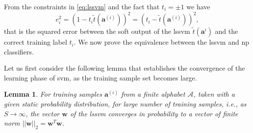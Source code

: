 \documentclass[draftcls,onecolumn,12pt]{IEEEtran}
\newtheorem{lemma}{Lemma}
\begin{document}
From the constraints in \eqref{eq:lssvm} and the fact that $t_i = \pm 1$ we have
\begin{equation}
\label{eq:els}
e_i^2 = (1 - t_i\tilde{t}(\mathbf{a}^{(i)}) )^2 = (t_i - \tilde{t}(\mathbf{a}^{(i)}))^2,
\end{equation}
that is the squared error between the soft output of the \ac{lssvm} $\tilde{t}(\mathbf{a}^i)$ and the correct training label $t_i$. We now prove the equivalence between the \ac{lssvm} and \ac{np} classifiers. 

Let us first consider the following lemma that establishes the convergence of the learning phase of \ac{svm}, as the training sample set becomes large.

\begin{lemma}
	\label{lem:lem1}
	For training samples $\bm{a}^{(i)}$ from a finite alphabet $\mathcal A$, taken with a given static probability distribution, for large number of training samples, i.e., as $S \rightarrow \infty$, the vector $\bm{w}$ of the \ac{lssvm} converges in probability to a vector of finite norm $||\mathbf{w}||_2 = \mathbf{w}^T\mathbf{w}$.
\end{lemma}
\end{document}
